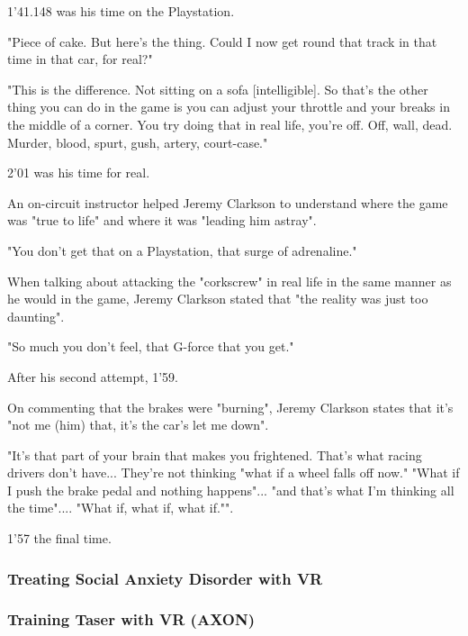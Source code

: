 \documentclass{article}
\begin{document}

1'41.148 was his time on the Playstation.

"Piece of cake. But here's the thing. Could I now get round that track in that time in that car, for real?"

"This is the difference. Not sitting on a sofa [intelligible]. So that's the other thing you can do in the game is you can adjust your throttle and your breaks in the middle of a corner. You try doing that in real life, you're off. Off, wall, dead. Murder, blood, spurt, gush, artery, court-case."

2'01 was his time for real. 

An on-circuit instructor helped Jeremy Clarkson to understand where the game was "true to life" and where it was "leading him astray".

"You don't get that on a Playstation, that surge of adrenaline." 

When talking about attacking the "corkscrew" in real life in the same manner as he would in the game, Jeremy Clarkson stated that "the reality was just too daunting". 

"So much you don't feel, that G-force that you get."

After his second attempt, 1'59. 

On commenting that the brakes were "burning", Jeremy Clarkson states that it's "not me (him) that, it's the car's let me down". 

"It's that part of your brain that makes you frightened. That's what racing drivers don't have... They're not thinking "what if a wheel falls off now." "What if I push the brake pedal and nothing happens"... "and that's what I'm thinking all the time".... "What if, what if, what if."".

1'57 the final time.

\subsubsection{Treating Social Anxiety Disorder with VR}

\subsubsection{Training Taser with VR (AXON)}

\end{document}
